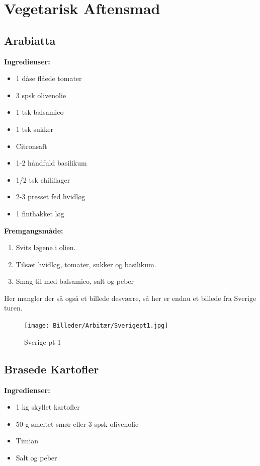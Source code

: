 \documentclass{book}
\begin{document}
\chapter{Vegetarisk Aftensmad}
\minitoc 
\newpage \section{Arabiatta}
\begin{minipage}[t]{0.5\textwidth}
\textbf{Ingredienser:}
\begin{itemize}
    \item 1 dåse flåede tomater
    \item 3 spsk olivenolie
    \item 1 tsk balsamico
    \item 1 tsk sukker
    \item Citronsaft
    \item 1-2 håndfuld basilikum
    \item 1/2 tsk chiliflager 
    \item 2-3 presset fed hvidløg
    \item 1 finthakket løg
\end{itemize}
\end{minipage}
\begin{minipage}[t]{0.5\textwidth}
\textbf{Fremgangsmåde:}
\begin{enumerate}
    \item Svits løgene i olien.
    \item Tilsæt hvidløg, tomater, sukker og basilikum.
    \item Smag til med balsamico, salt og peber
\end{enumerate}
\end{minipage}
\newpage Her mangler der så også et billede desværre, så her er endnu et billede fra Sverige turen.
\begin{figure}
    \centering
    \texttt{[image: Billeder/Arbitær/Sverigept1.jpg]}
    \caption{Sverige pt 1}
    
\end{figure}
\newpage \section{Brasede Kartofler}
\begin{minipage}[t]{0.5\textwidth}
\textbf{Ingredienser:}
\begin{itemize}
    \item 1 kg skyllet kartofler
\item 50 g smeltet smør eller 3 spsk olivenolie
\item Timian
\item Salt og peber
\end{itemize}
\end{minipage}
\end{document}
